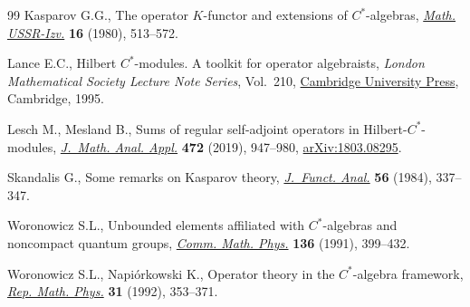\documentclass[11pt]{article}
\numberwithin{equation}{section}
\begin{document}
\begin{thebibliography}{99}
Kasparov G.G., The operator {$K$}-functor and extensions of {$C^*$}-algebras,
 \href{http://dx.doi.org/10.1070/IM1981v016n03ABEH001320}{\textit{Math. USSR-Izv.}} \textbf{16} (1980), 513--572.

Lance E.C., Hilbert {$C^*$}-modules. A toolkit for operator algebraists,
 \textit{London Mathematical Society Lecture Note Series}, Vol.~210, \href{https://doi.org/10.1017/CBO9780511526206}{Cambridge
 University Press}, Cambridge, 1995.

Lesch M., Mesland B., Sums of regular self-adjoint operators in
 {H}ilbert-{$C^*$}-modules, \href{https://doi.org/10.1016/j.jmaa.2018.11.059}{\textit{J.~Math. Anal. Appl.}} \textbf{472} (2019),
 947--980, \href{https://arxiv.org/abs/1803.08295}{arXiv:1803.08295}.

Skandalis G., Some remarks on {K}asparov theory, \href{https://doi.org/10.1016/0022-1236(84)90081-8}{\textit{J.~Funct. Anal.}}
 \textbf{56} (1984), 337--347.

Woronowicz S.L., Unbounded elements affiliated with {$C^*$}-algebras and
 noncompact quantum groups, \href{https://doi.org/10.1007/BF02100032}{\textit{Comm. Math. Phys.}} \textbf{136} (1991),
 399--432.

Woronowicz S.L., Napi\'orkowski K., Operator theory in the {$C^*$}-algebra
 framework, \href{https://doi.org/10.1016/0034-4877(92)90025-V}{\textit{Rep. Math. Phys.}} \textbf{31} (1992), 353--371.

\end{thebibliography}
\end{document}
